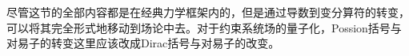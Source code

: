 
尽管这节的全部内容都是在经典力学框架内的，但是通过导数到变分算符的转变，可以将其完全形式地移动到场论中去。对于约束系统场的量子化，Possion括号与对易子的转变这里应该改成Dirac括号与对易子的改变。
	


